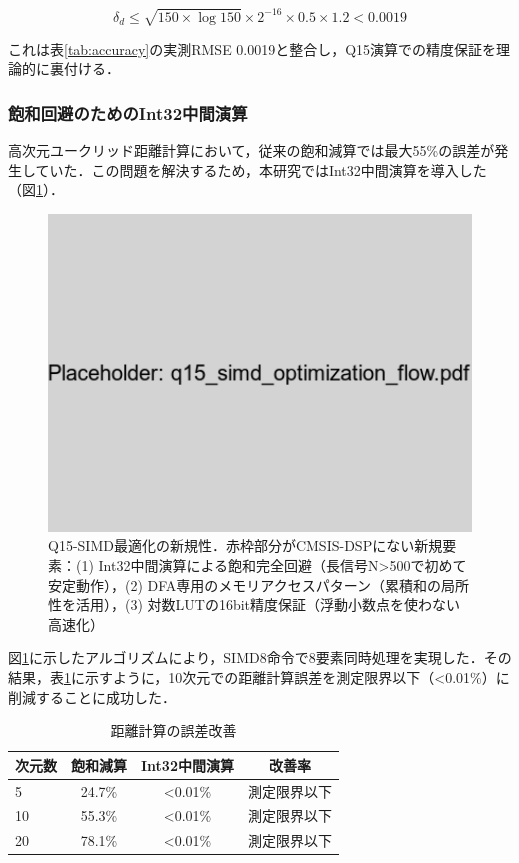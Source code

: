 \documentclass[paper]{ieice}
\begin{document}
\begin{equation}
\delta_d \leq \sqrt{150 \times \log 150} \times 2^{-16} \times 0.5 \times 1.2 < 0.0019
\end{equation}

これは表\ref{tab:accuracy}の実測RMSE 0.0019と整合し，Q15演算での精度保証を理論的に裏付ける．

\subsubsection{飽和回避のためのInt32中間演算}
高次元ユークリッド距離計算において，従来の飽和減算では最大55\%の誤差が発生していた．この問題を解決するため，本研究ではInt32中間演算を導入した（図\ref{fig:flowchart}）．

\begin{figure}[t]
\centering
\includegraphics[width=0.85\linewidth]{q15_simd_optimization_flow.pdf}
\caption{Q15-SIMD最適化の新規性．赤枠部分がCMSIS-DSPにない新規要素：(1) Int32中間演算による飽和完全回避（長信号N>500で初めて安定動作），(2) DFA専用のメモリアクセスパターン（累積和の局所性を活用），(3) 対数LUTの16bit精度保証（浮動小数点を使わない高速化）}
\label{fig:flowchart}
\end{figure}

図\ref{fig:flowchart}に示したアルゴリズムにより，SIMD8命令で8要素同時処理を実現した．その結果，表\ref{tab:distance_error}に示すように，10次元での距離計算誤差を測定限界以下（<0.01\%）に削減することに成功した．

\begin{table}[t]
\caption{距離計算の誤差改善}
\label{tab:distance_error}
\centering
\begin{tabular}{lccc}
\toprule
次元数 & 飽和減算 & Int32中間演算 & 改善率 \\
\midrule
5 & 24.7\% & <0.01\% & 測定限界以下 \\
10 & 55.3\% & <0.01\% & 測定限界以下 \\
20 & 78.1\% & <0.01\% & 測定限界以下 \\
\bottomrule
\end{tabular}
\end{table}
\end{document}
